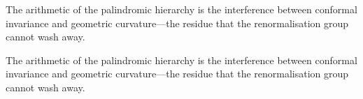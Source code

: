 \medskip
\noindent
The arithmetic of the palindromic hierarchy is the interference
between conformal invariance and geometric curvature---the residue
that the renormalisation group cannot wash away.




\medskip
\noindent
The arithmetic of the palindromic hierarchy is the interference
between conformal invariance and geometric curvature---the residue
that the renormalisation group cannot wash away.




